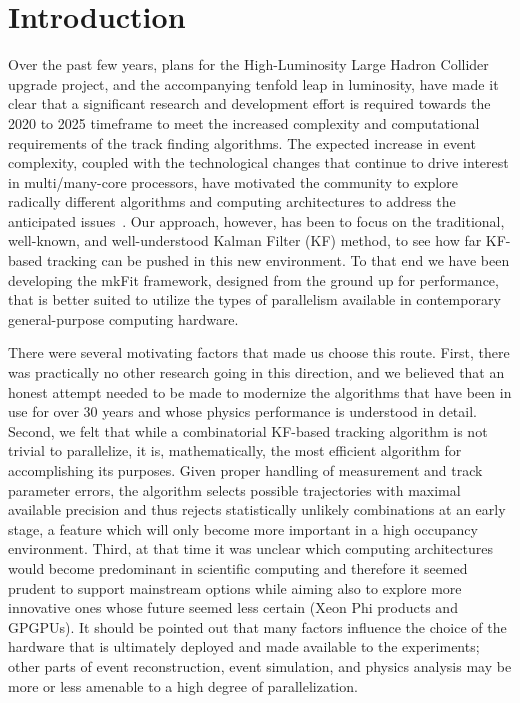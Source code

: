\documentclass{webofc}
\def\mkfit{mkFit\xspace}
\begin{document}
\maketitle


\section{Introduction}

Over the past few years, plans for the High-Luminosity Large Hadron Collider
upgrade project, and the accompanying tenfold leap in luminosity, have made it
clear that a significant research and development effort is required towards the
2020 to 2025 timeframe to meet the increased complexity and computational
requirements of the track finding algorithms. The expected increase in event
complexity, coupled with the technological changes that continue to drive
interest in multi/many-core processors, have motivated the community to explore
radically different algorithms and computing architectures to address the
anticipated issues~\cite{CTD2018}. Our approach, however, has been to focus on
the traditional, well-known, and well-understood Kalman Filter (KF) method, to
see how far KF-based tracking can be pushed in this new environment. To that
end we have been developing the \mkfit framework, designed from the ground up for
performance, that is better suited to utilize the types of parallelism available
in contemporary general-purpose computing hardware.

There were several motivating factors that made us choose this route. First,
there was practically no other research going in this direction, and we believed
that an honest attempt needed to be made to modernize the algorithms that have
been in use for over 30 years and whose physics performance is understood in
detail. Second, we felt that while a combinatorial KF-based tracking algorithm
is not trivial to parallelize, it is, mathematically, the most efficient
algorithm for accomplishing its purposes. Given proper handling of measurement
and track parameter errors, the algorithm selects possible trajectories with
maximal available precision and thus rejects statistically unlikely combinations
at an early stage, a feature which will only become more important in a high
occupancy environment. Third, at that time it was unclear which computing
architectures would become predominant in scientific computing and therefore it
seemed prudent to support mainstream options while aiming also to explore more
innovative ones whose future seemed less certain (Xeon Phi products and
GPGPUs). It should be pointed out that many factors influence the choice of the
hardware that is ultimately deployed and made available to the experiments;
other parts of event reconstruction, event simulation, and physics analysis may
be more or less amenable to a high degree of parallelization.
\end{document}
